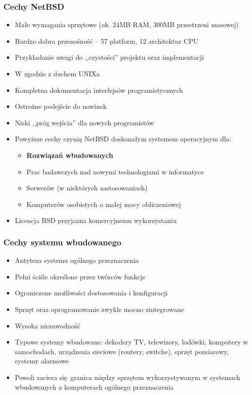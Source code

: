 \documentclass[dvipsnames,table]{beamer}
\begin{document}
\begin{frame}
\frametitle{Cechy NetBSD}
\begin{itemize}
	\item Małe wymagania sprzętowe (ok. 24MB RAM, 300MB przestrzeni masowej)
	\item Bardzo dobra przenośność -- 57 platform, 12 architektur CPU
	\item Przykładanie uwagi do ,,czystości'' projektu oraz implementacji
	\item W zgodzie z duchem UNIXa
	\item Kompletna dokumentacja interfejsów programistycznych
	\item Ostrożne podejście do nowinek
	\item Niski ,,próg wejścia'' dla nowych programistów
	\item Powyższe cechy czynią NetBSD doskonałym systemem operacyjnym dla:
	\begin{itemize}
		\item \textbf{Rozwiązań wbudowanych}
		\item Prac badawczych nad nowymi technologiami w informatyce
		\item Serwerów (w niektórych zastosowaniach)
		\item Komputerów osobistych o małej mocy obliczeniowej
	\end{itemize}
	\item Licencja BSD przyjazna komercyjnemu wykorzystaniu
\end{itemize}
\end{frame}

\begin{frame}
\frametitle{Cechy systemu wbudowanego}
\begin{itemize}
	\item Antyteza systemu ogólnego przeznaczenia
	\item Pełni ściśle określone przez twórców funkcje
	\item Ograniczone możliwości dostosowania i konfiguracji
	\item Sprzęt oraz oprogramowanie zwykle mocno zintegrowane
	\item Wysoka niezawodność
	\item Typowe systemy wbudowane: dekodery TV, telewizory, lodówki, komputery w samochodach, urządzenia sieciowe (routery, switche), sprzęt pomiarowy, systemy alarmowe
	\item Powoli zaciera się granica między sprzętem wykorzystywanym w systemach wbudowanych a komputerach ogólnego przeznaczenia
\end{itemize}
\end{frame}
\end{document}

